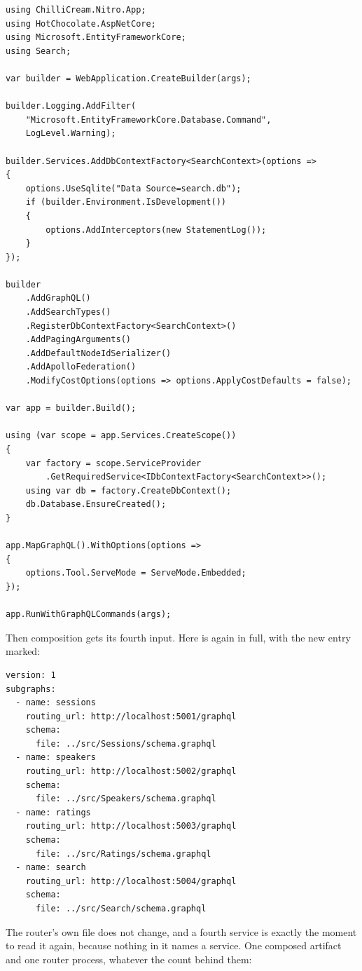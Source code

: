 \begin{verbatim}
using ChilliCream.Nitro.App;
using HotChocolate.AspNetCore;
using Microsoft.EntityFrameworkCore;
using Search;

var builder = WebApplication.CreateBuilder(args);

builder.Logging.AddFilter(
    "Microsoft.EntityFrameworkCore.Database.Command",
    LogLevel.Warning);

builder.Services.AddDbContextFactory<SearchContext>(options =>
{
    options.UseSqlite("Data Source=search.db");
    if (builder.Environment.IsDevelopment())
    {
        options.AddInterceptors(new StatementLog());
    }
});

builder
    .AddGraphQL()
    .AddSearchTypes()
    .RegisterDbContextFactory<SearchContext>()
    .AddPagingArguments()
    .AddDefaultNodeIdSerializer()
    .AddApolloFederation()
    .ModifyCostOptions(options => options.ApplyCostDefaults = false);

var app = builder.Build();

using (var scope = app.Services.CreateScope())
{
    var factory = scope.ServiceProvider
        .GetRequiredService<IDbContextFactory<SearchContext>>();
    using var db = factory.CreateDbContext();
    db.Database.EnsureCreated();
}

app.MapGraphQL().WithOptions(options =>
{
    options.Tool.ServeMode = ServeMode.Embedded;
});

app.RunWithGraphQLCommands(args);
\end{verbatim}

Then composition gets its fourth input. Here is  again
in full, with the new entry marked:

\begin{verbatim}
version: 1
subgraphs:
  - name: sessions
    routing_url: http://localhost:5001/graphql
    schema:
      file: ../src/Sessions/schema.graphql
  - name: speakers
    routing_url: http://localhost:5002/graphql
    schema:
      file: ../src/Speakers/schema.graphql
  - name: ratings
    routing_url: http://localhost:5003/graphql
    schema:
      file: ../src/Ratings/schema.graphql
  - name: search
    routing_url: http://localhost:5004/graphql
    schema:
      file: ../src/Search/schema.graphql
\end{verbatim}

The router's own file does not change, and a fourth service is exactly the
moment to read it again, because nothing in it names a service. One composed
artifact and one router process, whatever the count behind them:

